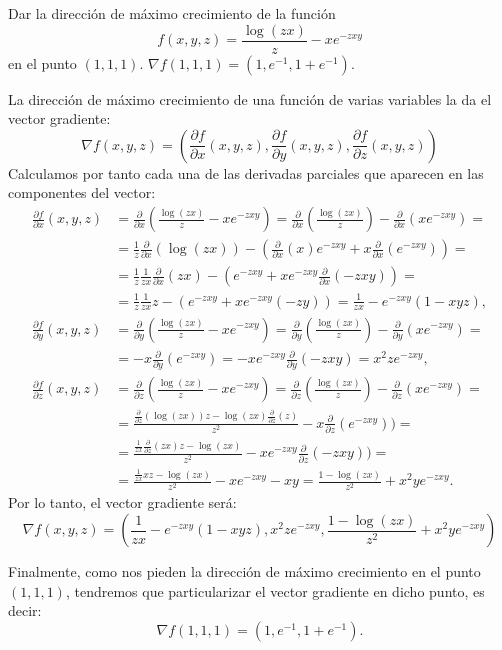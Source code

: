 {Dar la dirección de máximo crecimiento de la función
\[
f(x,y,z) = \frac{\log(zx)}z-xe^{-zxy}
\]
en el punto $(1,1,1)$.
}
{$\nabla f(1,1,1)=(1,e^{-1},1+e^{-1})$.
}
{La dirección de máximo crecimiento de una función de varias variables la da el vector gradiente:
\[
\nabla f(x,y,z) = \left(\frac{\partial f}{\partial x}(x,y,z),\frac{\partial f}{\partial y}(x,y,z),\frac{\partial f}{\partial z}(x,y,z)\right)
\]
Calculamos por tanto cada una de las derivadas parciales que aparecen en las componentes del vector:
\begin{align*}
\frac{\partial f}{\partial x}(x,y,z) &= \frac{\partial}{\partial x}(\frac{\log (zx)}z-xe^{-zxy}) = \frac{\partial}{\partial x}(\frac{\log (zx)}z)-\frac{\partial}{\partial x}(xe^{-zxy})= \\
&= \frac{1}{z}\frac{\partial}{\partial x}(\log (zx))-(\frac{\partial}{\partial x}(x)e^{-zxy}+x\frac{\partial}{\partial x}(e^{-zxy}))= \\
&= \frac{1}{z}\frac{1}{zx}\frac{\partial}{\partial x}(zx)-(e^{-zxy}+xe^{-zxy}\frac{\partial}{\partial x}(-zxy))= \\
&= \frac{1}{z}\frac{1}{zx}z-(e^{-zxy}+xe^{-zxy}(-zy)) = \frac{1}{zx}-e^{-zxy}(1-xyz),\\
\frac{\partial f}{\partial y}(x,y,z) &= \frac{\partial}{\partial y}(\frac{\log(zx)}z-xe^{-zxy}) = \frac{\partial}{\partial y}(\frac{\log (zx)}z)-\frac{\partial}{\partial y}(xe^{-zxy})= \\
&= -x\frac{\partial}{\partial y}(e^{-zxy}) = -xe^{-zxy}\frac{\partial}{\partial y}(-zxy)=x^2ze^{-zxy},\\
\frac{\partial f}{\partial z}(x,y,z) &= \frac{\partial}{\partial z}(\frac{\log(zx)}z-xe^{-zxy}) = \frac{\partial}{\partial z}(\frac{\log (zx)}z)-\frac{\partial}{\partial z}(xe^{-zxy})= \\
&= \frac{\frac{\partial}{\partial z}(\log (zx))z-\log (zx)\frac{\partial}{\partial z}(z)}{z^2}-x\frac{\partial}{\partial z}(e^{-zxy}))= \\
&= \frac{\frac 1{zx}\frac \partial {\partial z}(zx)z-\log (zx)}{z^2}-xe^{-zxy}\frac{\partial}{\partial z}(-zxy))= \\
&= \frac{\frac 1{zx}xz-\log (zx)}{z^2}-xe^{-zxy}-xy=\frac{1-\log (zx)}{z^2}+x^2ye^{-zxy}.
\end{align*}
Por lo tanto, el vector gradiente será:
\[
\nabla f(x,y,z)=(\frac{1}{zx}-e^{-zxy}(1-xyz), x^2ze^{-zxy}, \frac{1-\log (zx)}{z^2}+x^2ye^{-zxy})
\]

Finalmente, como nos pieden la dirección de máximo crecimiento en el punto $(1,1,1)$, tendremos que particularizar el vector gradiente en dicho punto, es decir:
\[
\nabla f(1,1,1)=(1,e^{-1},1+e^{-1}).
\]
}


